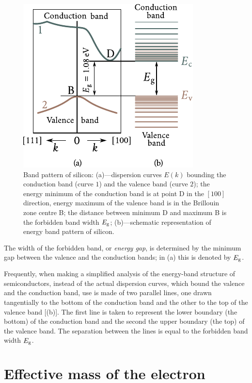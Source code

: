 \begin{figure}[t]
	\begin{center}
		\includegraphics[scale=1]{figures/ch_05/fig_5_11.pdf}
		\caption[]{Band pattern of silicon: (a)---dispersion curves $E(k)$ bounding the conduction band (curve $1$) and the valence band (curve $2$); the energy minimum of the conduction band is at point D in the $[100]$ direction, energy maximum of the valence band is in the Brillouin zone centre B; the distance between minimum D and maximum B is the forbidden band width $E_{\text{g}}$; (b)---schematic representation of energy band pattern of silicon.}
		\label{fig:5_11}
	\end{center}
	\vspace{-0.7cm}
\end{figure}

The width of the forbidden band, or \textit{energy gap}, is determined by the minimum gap between the valence and the conduction bands; in (a) this is denoted by $E_{\text{g}}$.

Frequently, when making a simplified analysis of the energy-band structure of semiconductors, instead of the actual dispersion curves, which bound the valence and the conduction band, use is made of two parallel lines, one drawn tangentially to the bottom of the conduction band and the other to the top of the valence band [(b)]. The first line is taken to represent the lower boundary (the bottom) of the conduction band and the second the upper boundary (the top) of the valence band. The separation between the lines is equal to the forbidden band width $E_{\text{g}}$.

\section{Effective mass of the electron}\label{sec:41}

